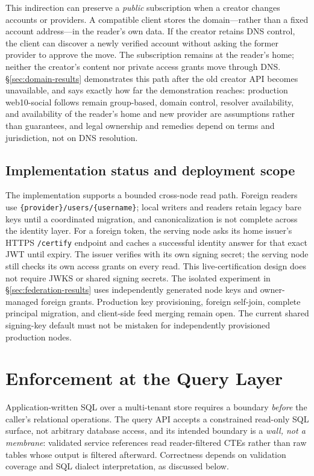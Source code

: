 \documentclass[sigconf, nonacm]{acmart}
\begin{document}
This indirection can preserve a \emph{public} subscription when a creator
changes accounts or providers. A compatible client stores the domain---rather
than a fixed account address---in the reader's own data. If the creator
retains DNS control, the client can discover a newly verified account without
asking the former provider to approve the move. The subscription remains at
the reader's home; neither the creator's content nor private access grants
move through DNS. \S\ref{sec:domain-results} demonstrates this path after the
old creator API becomes unavailable, and says exactly how far the
demonstration reaches: production web10-social follows remain group-based,
domain control, resolver availability, and availability of the reader's home
and new provider are assumptions rather than guarantees, and legal ownership
and remedies depend on terms and jurisdiction, not on DNS resolution.

\subsection{Implementation status and deployment scope}

The implementation supports a bounded cross-node read path. Foreign readers
use \texttt{\{provider\}/users/\{username\}}; local writers and readers
retain legacy bare keys until a coordinated migration, and canonicalization
is not complete across the identity layer. For a foreign token, the serving
node asks its home issuer's HTTPS \texttt{/certify} endpoint and caches a
successful identity answer for that exact JWT until expiry. The issuer
verifies with its own signing secret; the serving node still checks its own
access grants on every read. This live-certification design does not require
JWKS or shared signing secrets. The isolated experiment in
\S\ref{sec:federation-results} uses independently generated node keys and
owner-managed foreign grants. Production key provisioning, foreign self-join,
complete principal migration, and client-side feed merging remain open. The
current shared signing-key default must not be mistaken for independently
provisioned production nodes.

\section{Enforcement at the Query Layer}
\label{sec:enforcement}

Application-written SQL over a multi-tenant store requires a boundary \emph{before}
the caller's relational operations. The query API accepts a constrained
read-only SQL surface, not arbitrary database access, and its intended
boundary is a \emph{wall, not a membrane}: validated service references read
reader-filtered CTEs rather than raw tables whose output is filtered
afterward. Correctness depends on validation coverage and SQL dialect
interpretation, as discussed below.
\end{document}
